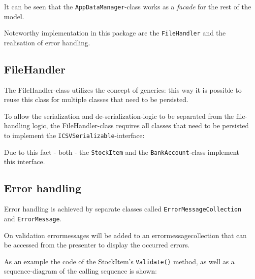 It can be seen that the \texttt{AppDataManager}-class works as a \textit{facade} for the rest of the model.

Noteworthy implementation in this package are the \texttt{FileHandler} and the realisation of error handling.

\subsection{FileHandler}
\label{subsec:filehandler}

The FileHandler-class utilizes the concept of generics: this way it is possible to reuse this class for multiple classes that need to be persisted.

To allow the serialization and de-serialization-logic to be separated from the file-handling logic, the FileHandler-class requires all classes that need to be persisted to implement the \texttt{ICSVSerializable}-interface:



Due to this fact - both - the \texttt{StockItem} and the \texttt{BankAccount}-class implement this interface.

\subsection{Error handling}
\label{subsec:error_handling}

Error handling is achieved by separate classes called \texttt{ErrorMessageCollection} and \texttt{ErrorMessage}.

On validation errormessages will be added to an errormessagecollection that can be accessed from the presenter to display the occurred errors.

As an example the code of the StockItem's \texttt{Validate()} method, as well as a sequence-diagram of the calling sequence is shown:

